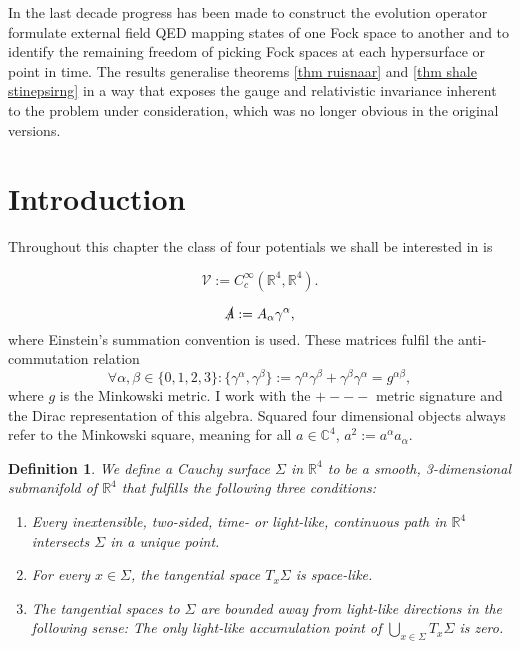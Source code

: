 \documentclass[b5paper,draft,openbib,12pt]{memoir}
\newtheorem{Def}{Definition}
\begin{document}
In the last decade progress has been made to construct 
the evolution operator formulate external 
field QED mapping states of one Fock space to another and 
to identify the remaining freedom of picking Fock spaces 
at each hypersurface or point in time. The results generalise 
theorems \ref{thm ruisnaar} and \ref{thm shale stinepsirng}
in a way that exposes the gauge and relativistic invariance 
inherent to the problem under consideration, which was no 
longer obvious in the original versions. 





%
%
%
%
%
%
%
%
%
%



\section{Introduction}


Throughout this chapter the class of four potentials we shall be 
interested in is 

\begin{equation}
  \mathcal{V}:= C_c^\infty(\mathbb{R}^4,\mathbb{R}^4).
\end{equation}






\begin{equation}
  \slashed{A}:= A_\alpha \gamma^\alpha,
\end{equation}
where Einstein's summation convention is used. These matrices fulfil the anti-commutation relation
\begin{equation}
\forall \alpha, \beta \in \{0,1,2,3\}:\{\gamma^\alpha, \gamma^\beta\}:= \gamma^\alpha \gamma^\beta+ \gamma^\beta \gamma^\alpha= g^{\alpha \beta},
\end{equation}
where \(g\) is the Minkowski metric. I work with the \(+---\) metric signature and the Dirac representation of this algebra. Squared four dimensional objects always refer to the Minkowski square, meaning for all \(a\in \mathbb{C}^4\), \(a^2:= a^{\alpha} a_{\alpha}\). 


\begin{Def}
  We define a Cauchy surface \(\Sigma\) in \(\mathbb{R}^4\) to be a smooth, 3-dimensional submanifold of \(\mathbb{R}^4\) that fulfills
  the following three conditions:
  \begin{enumerate}[label=\alph*)]
  \item Every inextensible, two-sided, time- or light-like, continuous path in \(\mathbb{R}^4\) intersects \(\Sigma\) in a unique point.
  \item For every \(x\in\Sigma\), the tangential space \(T_x\Sigma\) is space-like.
  \item The tangential spaces to \(\Sigma\) are bounded away from light-like directions in the following sense: The only light-like accumulation point of 
  \(\bigcup_{x\in \Sigma} T_x \Sigma\) is zero.
  \end{enumerate}
\end{Def}
\end{document}
